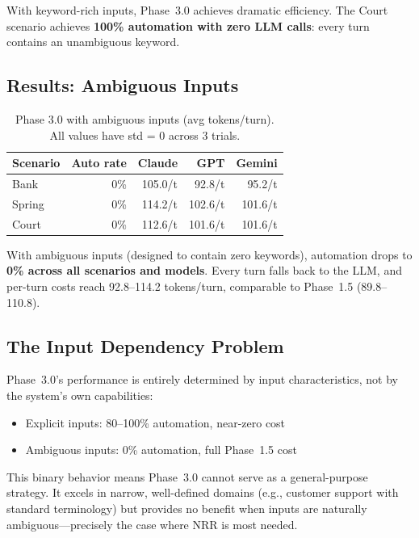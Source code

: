 \documentclass[11pt,a4paper]{article}
\begin{document}
With keyword-rich inputs, Phase~3.0 achieves dramatic efficiency. The Court
scenario achieves \textbf{100\% automation with zero LLM calls}: every turn
contains an unambiguous keyword.

\subsection{Results: Ambiguous Inputs}

\begin{table}[ht]
\centering
\begin{tabular}{lrrrr}
\toprule
\textbf{Scenario} & \textbf{Auto rate} & \textbf{Claude} & \textbf{GPT} & \textbf{Gemini} \\
\midrule
Bank & 0\% & 105.0/t & 92.8/t & 95.2/t \\
Spring & 0\% & 114.2/t & 102.6/t & 101.6/t \\
Court & 0\% & 112.6/t & 101.6/t & 101.6/t \\
\bottomrule
\end{tabular}
\caption{Phase 3.0 with ambiguous inputs (avg tokens/turn). All values have
std = 0 across 3 trials.}
\label{tab:phase3_0_ambiguous}
\end{table}

With ambiguous inputs (designed to contain zero keywords), automation drops to
\textbf{0\% across all scenarios and models}. Every turn falls back to the LLM,
and per-turn costs reach 92.8--114.2 tokens/turn, comparable to Phase~1.5
(89.8--110.8).

\subsection{The Input Dependency Problem}

Phase~3.0's performance is entirely determined by input characteristics, not by
the system's own capabilities:

\begin{itemize}
    \item Explicit inputs: 80--100\% automation, near-zero cost
    \item Ambiguous inputs: 0\% automation, full Phase~1.5 cost
\end{itemize}

This binary behavior means Phase~3.0 cannot serve as a general-purpose strategy.
It excels in narrow, well-defined domains (e.g., customer support with standard
terminology) but provides no benefit when inputs are naturally ambiguous---precisely
the case where NRR is most needed.
\end{document}
